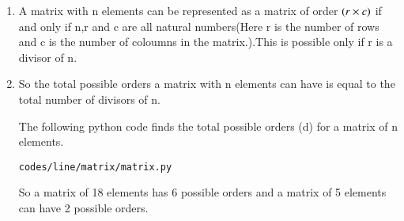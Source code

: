 \renewcommand{\theequation}{\theenumi}
\begin{enumerate}[label=\thesection.\arabic*.,ref=\thesection.\theenumi]

\item A matrix with n elements can be represented as a matrix of order $\left(r\times c\right)$ if and only if n,r and c are all natural numbers(Here r is the number of rows and c is the number of coloumns in the matrix.).This is possible only if r is a divisor of n.

\item So the total possible orders a matrix with n elements can have is equal to the total number of divisors of n.

The following python code finds the total possible orders (d) for a matrix of n elements. 
\begin{lstlisting}
codes/line/matrix/matrix.py
\end{lstlisting}
So a matrix of 18 elements has 6 possible orders and a matrix of 5 elements can have 2 possible orders.
\end{enumerate}
